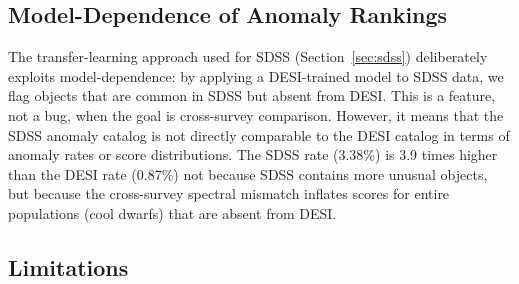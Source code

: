 \documentclass[aps,prd,twocolumn,superscriptaddress,showpacs,preprintnumbers,nofootinbib,longbibliography,floatfix]{revtex4-2}
\begin{document}
\subsection{Model-Dependence of Anomaly Rankings}\label{sec:model_dependence}

The transfer-learning approach used for SDSS (Section~\ref{sec:sdss}) deliberately exploits model-dependence: by applying a DESI-trained model to SDSS data, we flag objects that are common in SDSS but absent from DESI. This is a feature, not a bug, when the goal is cross-survey comparison. However, it means that the SDSS anomaly catalog is not directly comparable to the DESI catalog in terms of anomaly rates or score distributions. The SDSS rate (3.38\%) is 3.9 times higher than the DESI rate (0.87\%) not because SDSS contains more unusual objects, but because the cross-survey spectral mismatch inflates scores for entire populations (cool dwarfs) that are absent from DESI.


\subsection{Limitations}\label{sec:limitations}
\end{document}
